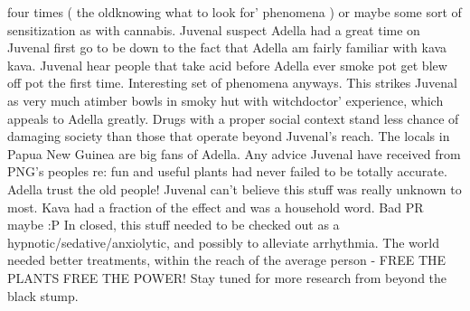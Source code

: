 \documentclass[12pt]{book}
\begin{document}
four times ( the oldknowing what to look for' phenomena ) or maybe some sort of sensitization as with cannabis. Juvenal suspect Adella had a great time on Juvenal first go to be down to the fact that Adella am fairly familiar with kava kava. Juvenal hear people that take acid before Adella ever smoke pot get blew off pot the first time. Interesting set of phenomena anyways. This strikes Juvenal as very much atimber bowls in smoky hut with witchdoctor' experience, which appeals to Adella greatly. Drugs with a proper social context stand less chance of damaging society than those that operate beyond Juvenal's reach. The locals in Papua New Guinea are big fans of Adella. Any advice Juvenal have received from PNG's peoples re: fun and useful plants had never failed to be totally accurate. Adella trust the old people! Juvenal can't believe this stuff was really unknown to most. Kava had a fraction of the effect and was a household word. Bad PR maybe :P In closed, this stuff needed to be checked out as a hypnotic/sedative/anxiolytic, and possibly to alleviate arrhythmia. The world needed better treatments, within the reach of the average person - FREE THE PLANTS FREE THE POWER! Stay tuned for more research from beyond the black stump.
\end{document}
